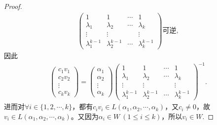 \documentclass[../../main.tex]{subfiles}%
\begin{document}
\begin{proof}
\begin{align*}
\begin{pmatrix}
1 & 1 & \cdots & 1 \\
\lambda_1 & \lambda_2 & \cdots & \lambda_k \\
\vdots & \vdots & & \vdots \\
\lambda_1^{k - 1} & \lambda_2^{k - 1} & \cdots & \lambda_k^{k - 1}
\end{pmatrix} \text{可逆},
\end{align*}
因此
\begin{align*}
\begin{pmatrix}
c_1v_1 \\
c_2v_2 \\
\vdots \\
c_kv_k
\end{pmatrix} = 
\begin{pmatrix}
\alpha_1 \\
\alpha_2 \\
\vdots \\
\alpha_k
\end{pmatrix} 
\begin{pmatrix}
1 & 1 & \cdots & 1 \\
\lambda_1 & \lambda_2 & \cdots & \lambda_k \\
\vdots & \vdots & & \vdots \\
\lambda_1^{k - 1} & \lambda_2^{k - 1} & \cdots & \lambda_k^{k - 1}
\end{pmatrix}^{-1}.
\end{align*}
进而对$\forall i\in \{1,2,\cdots,k\}$，都有$c_iv_i\in L(\alpha_1,\alpha_2,\cdots,\alpha_k)$，又$c_i\ne 0$，故$v_i\in L(\alpha_1,\alpha_2,\cdots,\alpha_k)$。又因为$\alpha_i\in W\ (1\leqslant i\leqslant k)$，所以$v_i\in W$.

\end{proof}
\end{document}
